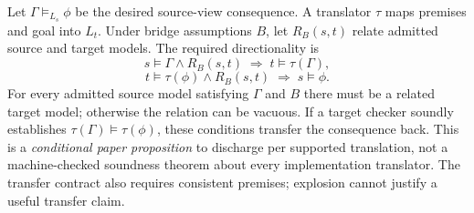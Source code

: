 \documentclass{article}
\begin{document}
Let $\Gamma\models_{L_s}\phi$ be the desired source-view consequence. A translator $\tau$ maps premises and goal into $L_t$. Under bridge assumptions $B$, let $R_B(s,t)$ relate admitted source and target models. The required directionality is
\begin{equation}
s\models\Gamma\land R_B(s,t)\;\Rightarrow\; t\models\tau(\Gamma),
\label{eq:prem}
\end{equation}
\begin{equation}
t\models\tau(\phi)\land R_B(s,t)\;\Rightarrow\; s\models\phi.
\label{eq:goal}
\end{equation}
For every admitted source model satisfying $\Gamma$ and $B$ there must be a related target model; otherwise the relation can be vacuous. If a target checker soundly establishes $\tau(\Gamma)\models\tau(\phi)$, these conditions transfer the consequence back. This is a \emph{conditional paper proposition} to discharge per supported translation, not a machine-checked soundness theorem about every implementation translator. The transfer contract also requires consistent premises; explosion cannot justify a useful transfer claim.
\end{document}
